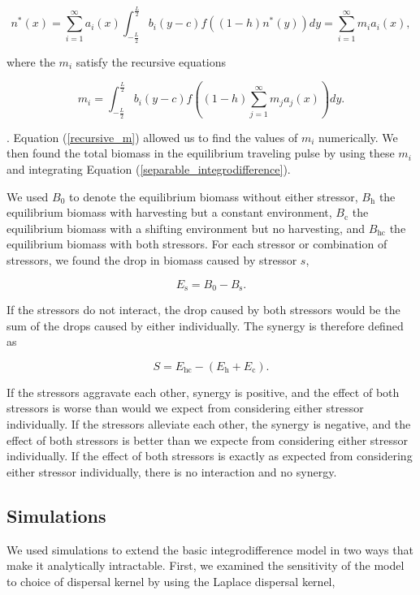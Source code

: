 \documentclass[12pt,english]{article}
\begin{document}
\begin{spacing}{1.9}
\begin{flushleft}
\begin{equation}
n^*(x)=\sum^\infty_{i=1}
a_i(x)\int^{\frac{L}{2}}_{-\frac{L}{2}}b_i(y-c)f((1-h)n^*(y))dy=\sum^\infty_{i=1}m_ia_i(x), \label{separable_integrodifference}
\end{equation}

\noindent where the $m_i$ satisfy the recursive equations

\begin{equation}
m_i=\int^{\frac{L}{2}}_{-\frac{L}{2}}b_i(y-c)f\left((1-h)\sum^\infty_{j=1}m_ja_j(x)\right)
dy. \label{recursive_m}
\end{equation}

\noindent \citep{Latore:1998fk}. Equation (\ref{recursive_m}) allowed us to find the values of $m_i$ numerically. We then found the total biomass in the 
equilibrium traveling pulse by using these $m_i$ and integrating Equation (\ref{separable_integrodifference}).


We used $B_0$ to denote the equilibrium biomass 
without either stressor, $B_\text{h}$ the equilibrium biomass with harvesting but a constant environment, $B_\text{c}$ the 
equilibrium biomass with a shifting environment but no harvesting, and $B_\text{hc}$ the equilibrium biomass with 
both stressors. For each stressor or combination of stressors, we found the drop in  biomass caused 
by stressor $s$,

\[E_\text{s}=B_0-B_\text{s}.\]

\noindent If the stressors do not interact, the drop caused by both stressors would be the sum of the drops caused by 
either individually. The synergy is therefore defined as

\[S = E_\text{hc}-\left(E_\text{h}+E_\text{c}\right).\]

\noindent If the stressors aggravate each other, synergy is positive, and the effect of both stressors is worse than would we expect from considering either stressor individually. If the stressors alleviate each other, the synergy is negative, and the effect of both stressors is better than we expecte from considering either stressor individually. If the effect of both stressors is exactly as expected from considering either stressor individually, there is no interaction and no synergy.

\subsection{Simulations }

We used simulations to extend the basic integrodifference model in two ways that make it analytically intractable. First, we examined the sensitivity of the model to choice of dispersal kernel by using the Laplace dispersal kernel, 


\end{flushleft}
\end{spacing}
\end{document}
